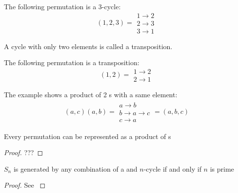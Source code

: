 \begin{appendices}
\begin{example}[Cycle]
  The following permutation is a 3-cycle:
  \[
  (1,2,3) = \begin{array}{c}
                1 \to 2 \\
                2 \to 3 \\
                3 \to 1 
              \end{array}
  \]
  \label{ex:cycle}
\end{example}

\begin{definition}[Transposition]
  A cycle with only two elements is called a transposition.
  \cite{wiki:cyclicpermutation}
  \label{def:transposition}
\end{definition}

\begin{example}[Transposition]
  The following permutation is a transposition:
  \[
  (1,2) = \begin{array}{c}
                1 \to 2 \\
                2 \to 1 
              \end{array}
  \]
  \label{ex:transposition}
\end{example}

\begin{example}
  The example shows a product of 2 s with a
  same element:
  \begin{eqnarray}
    (a,c)(a,b) = 
    \begin{array}{c}
      a \to b \\
      b \to a \to c\\
      c \to a 
    \end{array} = (a,b,c)
    \nonumber
  \end{eqnarray}
  \label{ex:transposition_product}
\end{example}


\begin{theorem}
  Every permutation can be represented as a product of
  s
  \begin{proof}
    ???
  \end{proof}
  \label{thm:permutationrepresent}
\end{theorem}

\begin{corollary}
  $S_n$ is generated by any combination of a  and
  $n$-cycle if and only if $n$ is prime
  \label{cor:sn}
  \begin{proof}
    See \cite{mathstackexchange:sn}
  \end{proof}
\end{corollary}


\end{appendices}
